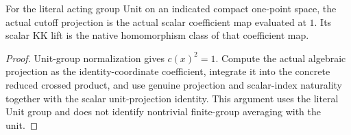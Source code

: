\begin{proposition}\label{prop:unit-point-cutoff-hom-class}
\leanok
For the literal acting group $\mathrm{Unit}$ on an indicated compact
one-point space, the actual cutoff projection is the actual scalar
coefficient map evaluated at $1$. Its scalar KK lift is the native
homomorphism class of that coefficient map.
\end{proposition}
\begin{proof}
\leanok
Unit-group normalization gives $c(x)^2=1$. Compute the actual algebraic
projection as the identity-coordinate coefficient, integrate it into the
concrete reduced crossed product, and use genuine projection and scalar-index
naturality together with the scalar unit-projection identity. This argument
uses the literal Unit group and does not identify nontrivial finite-group
averaging with the unit.
\end{proof}

